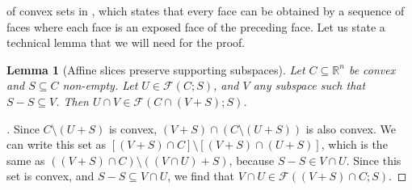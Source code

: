 \documentclass{article}
\theoremstyle{plain}
\newtheorem{lemma}{Lemma}[section]
\theoremstyle{definition}
\theoremstyle{remark}
\begin{document}
of convex sets in \cite[Proposition 6]{martinez-legaz_LEXICOGRAPHICALCHARACTERIZATIONFACES_},
which states that every face can be obtained by a sequence of faces
where each face is an exposed face of the preceding face. Let us state
a technical lemma that we will need for the proof.
\begin{lemma}[Affine slices preserve supporting subspaces]
\label{loc:affine_slices_preserve_supporting_subspaces.statement}
Let $C \subseteq \mathbb{R}^n$ be convex and $S \subseteq C$ non-empty.
Let $U \in \mathcal{F}(C;S)$, and $V$ any subspace such that
$S-S \subseteq V$. Then $U \cap V \in \mathcal{F}(C \cap (V+S);S)$.
\end{lemma}
\begin{proof}[\hypertarget{loc:affine_slices_preserve_supporting_subspaces.proof}Proof of \Cref{loc:affine_slices_preserve_supporting_subspaces.statement}]

Since $C \setminus (U + S)$ is convex, 
$(V+S)  \cap (C \setminus (U + S))$ is also convex. 
We can write this set as $[(V+S) \cap C] \setminus [(V+S) \cap (U+S)]$,
which is the same as $((V+S) \cap C) \setminus ((V \cap U)+S)$, because $S-S \in V \cap U$.
Since this set is convex, and $S-S \subseteq V  \cap U$, we find that $V \cap U \in \mathcal{F}((V +S) \cap C;S)$.
\end{proof}
\end{document}
